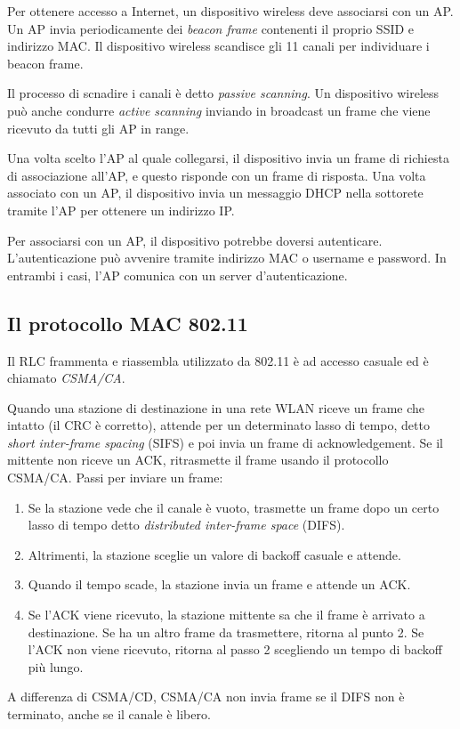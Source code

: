 \documentclass[11pt]{book}
\begin{document}
Per ottenere accesso a Internet, un dispositivo wireless deve associarsi con un AP. Un AP invia periodicamente dei 
\textit{beacon frame} contenenti il proprio SSID e indirizzo MAC. Il dispositivo wireless scandisce gli 11 canali per 
individuare i beacon frame. 

Il processo di scnadire i canali è detto \textit{passive scanning}. Un dispositivo wireless può anche condurre \textit{active 
scanning} inviando in broadcast un frame che viene ricevuto da tutti gli AP in range.

Una volta scelto l'AP al quale collegarsi, il dispositivo invia un frame di richiesta di associazione all'AP, e questo 
risponde con un frame di risposta. Una volta associato con un AP, il dispositivo invia un messaggio DHCP nella sottorete 
tramite l'AP per ottenere un indirizzo IP.

Per associarsi con un AP, il dispositivo potrebbe doversi autenticare. L'autenticazione può avvenire tramite indirizzo MAC 
o username e password. In entrambi i casi, l'AP comunica con un server d'autenticazione.
\subsection{Il protocollo MAC 802.11}
Il RLC frammenta e riassembla utilizzato da 802.11 è ad accesso casuale ed è chiamato \textit{CSMA/CA}.

Quando una stazione di destinazione in una rete WLAN riceve un frame che intatto (il CRC è corretto), attende per un determinato
lasso di tempo, detto \textit{short inter-frame spacing} (SIFS) e poi invia un frame di acknowledgement. Se il mittente 
non riceve un ACK, ritrasmette il frame usando il protocollo CSMA/CA. Passi per inviare un frame:
\begin{enumerate}
    \item Se la stazione vede che il canale è vuoto, trasmette un frame dopo un certo lasso di tempo detto \textit{distributed
    inter-frame space} (DIFS).
    \item Altrimenti, la stazione sceglie un valore di backoff casuale e attende.
    \item Quando il tempo scade, la stazione invia un frame e attende un ACK.
    \item Se l'ACK viene ricevuto, la stazione mittente sa che il frame è arrivato a destinazione. Se ha un altro frame 
    da trasmettere, ritorna al punto 2. Se l'ACK non viene ricevuto, ritorna al passo 2 scegliendo un tempo di backoff più
    lungo.
\end{enumerate}
A differenza di CSMA/CD, CSMA/CA non invia frame se il DIFS non è terminato, anche se il canale è libero.
\end{document}
